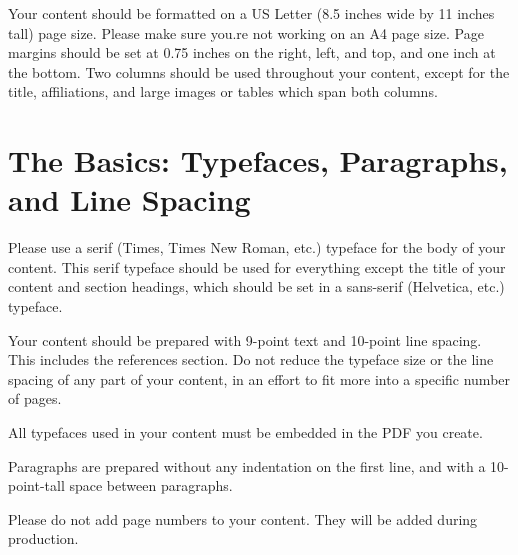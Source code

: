 \documentclass[conference]{acmsiggraph}
\begin{document}
Your content should be formatted on a US Letter (8.5 inches wide by 11
inches tall) page size. Please make sure you.re not working on an A4
page size. Page margins should be set at 0.75 inches on the right,
left, and top, and one inch at the bottom. Two columns should be used
throughout your content, except for the title, affiliations, and large
images or tables which span both columns.

\section{The Basics: Typefaces, Paragraphs, and Line Spacing}

Please use a serif (Times, Times New Roman, etc.) typeface for the
body of your content. This serif typeface should be used for
everything except the title of your content and section headings,
which should be set in a sans-serif (Helvetica, etc.) typeface.

Your content should be prepared with 9-point text and 10-point line
spacing. This includes the references section. Do not reduce the
typeface size or the line spacing of any part of your content, in an
effort to fit more into a specific number of pages. 

All typefaces used in your content must be embedded in the PDF you
create. 

Paragraphs are prepared without any indentation on the first line, and
with a 10-point-tall space between paragraphs.

Please do not add page numbers to your content. They will be added
during production.


\nocite{*}

\end{document}
